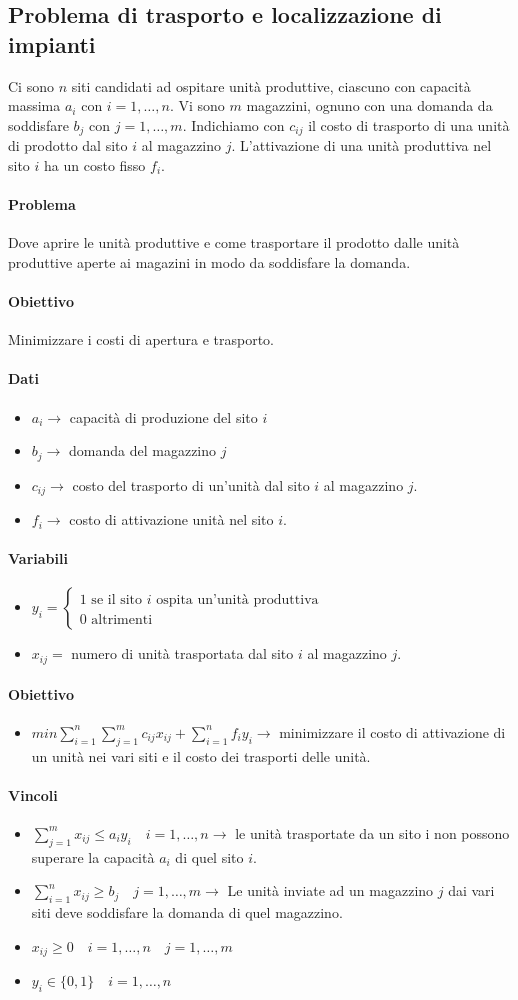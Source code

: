 \documentclass[12pt, twoside, letterpaper]{article}
\newcommand{\problema}[5]{
	#1
	\begin{dati}
		\paragraph{Dati} #2
	\end{dati}
	\begin{variabili}
		\paragraph{Variabili} #3
	\end{variabili}
	\begin{obiettivo}
		\paragraph{Obiettivo} #4
	\end{obiettivo}
	\begin{vincoli}
		\paragraph{Vincoli} #5
	\end{vincoli}
}
\begin{document}
		\subsection{Problema di trasporto e localizzazione di impianti}
			\problema
			{Ci sono $n$ siti candidati ad ospitare unità produttive, ciascuno con capacità massima $a_i$ con $i=1, \dots, n$. Vi sono $m$ magazzini, ognuno con una domanda da soddisfare $b_j$ con $j = 1, \dots, m$. Indichiamo con $c_{ij}$ il costo di trasporto di una unità di prodotto dal sito $i$ al magazzino $j$. L'attivazione di una unità produttiva nel sito $i$ ha un costo fisso $f_i$. 
			\paragraph{Problema} Dove aprire le unità produttive e come trasportare il prodotto dalle unità produttive aperte ai magazini in modo da soddisfare la domanda.
			\paragraph{Obiettivo} Minimizzare i costi di apertura e trasporto.}
			{\begin{itemize}
				\item $a_i \rightarrow$ capacità di produzione del sito $i$
				\item $b_j \rightarrow$ domanda del magazzino $j$ 
				\item $c_{ij} \rightarrow$ costo del trasporto di un'unità dal sito $i$ al magazzino $j$. 
				\item $f_i \rightarrow$ costo di attivazione unità nel sito $i$.  
			\end{itemize}} 
			{\begin{itemize} 
				\item $y_i = \begin{cases} \text{1 se il sito $i$ ospita un'unità produttiva} \\ \text{0 altrimenti}\end{cases}$
				\item $x_{ij} =$ numero di unità trasportata dal sito $i$ al magazzino $j$.
			\end{itemize}}
			{\begin{itemize}
				\item $min \sum_{i=1}^n \sum_{j=1}^m c_{ij}x_{ij} + \sum_{i=1}^n f_i y_i \rightarrow$ minimizzare il costo di attivazione di un unità nei vari siti e il costo dei trasporti delle unità.
			\end{itemize}}
			{\begin{itemize}
				\item $\sum_{j=1}^m x_{ij} \leq a_i y_i \quad i = 1, \dots, n \rightarrow$ le unità trasportate da un sito i non possono superare la capacità $a_i$ di quel sito $i$.
				\item $\sum_{i=1}^n x_{ij} \geq b_j \quad j=1, \dots, m \rightarrow$ Le unità inviate ad un magazzino $j$ dai vari siti deve soddisfare la domanda di quel magazzino.
				\item $x_{ij} \geq 0 \quad i=1, \dots, n \quad j = 1, \dots, m$
				\item $y_i \in \{0,1\} \quad i=1, \dots, n$
			\end{itemize}}
						
\end{document}

